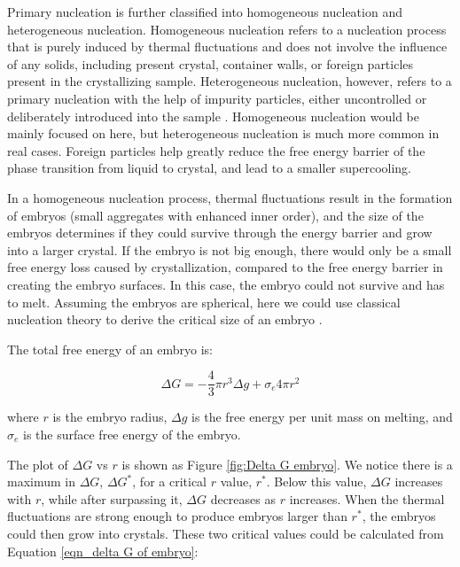 Primary nucleation is further classified into homogeneous nucleation and heterogeneous nucleation. Homogeneous nucleation refers to a nucleation process that is purely induced by thermal fluctuations and does not involve the influence of any solids, including present crystal, container walls, or foreign particles present in the crystallizing sample. Heterogeneous nucleation, however, refers to a primary nucleation with the help of impurity particles, either uncontrolled or deliberately introduced into the sample \cite{Strobl2007}. Homogeneous nucleation would be mainly focused on here, but heterogeneous nucleation is much more common in real cases. Foreign particles help greatly reduce the free energy barrier of the phase transition from liquid to crystal, and lead to a smaller supercooling.

In a homogeneous nucleation process, thermal fluctuations result in the formation of embryos (small aggregates with enhanced inner order), and the size of the embryos determines if they could survive through the energy barrier and grow into a larger crystal. If the embryo is not big enough, there would only be a small free energy loss caused by crystallization, compared to the free energy barrier in creating the embryo surfaces. In this case, the embryo could not survive and has to melt. Assuming the embryos are spherical, here we could use classical nucleation theory to derive the critical size of an embryo \cite{Chai2016}.

The total free energy of an embryo is:

\begin{equation}
\label{eqn_delta G of embryo}
\Delta G = -\dfrac{4}{3} \pi r^{3} \Delta g + \sigma_{e} 4 \pi r^{2}
\end{equation}

\noindent
where $r$ is the embryo radius, $\Delta g$ is the free energy per unit mass on melting, and $\sigma_{e}$ is the surface free energy of the embryo.

The plot of $\Delta G$ vs $r$ is shown as Figure \ref{fig:Delta G embryo}. We notice there is a maximum in  $\Delta G$, $\Delta G^{*}$, for a critical $r$ value, $r^{*}$. Below this value, $\Delta G$ increases with $r$, while after surpassing it, $\Delta G$ decreases as $r$ increases. When the thermal fluctuations are strong enough to produce embryos larger than $r^{*}$, the embryos could then grow into crystals. These two critical values could be calculated \cite{Hoffman1997} from Equation \ref{eqn_delta G of embryo}:

